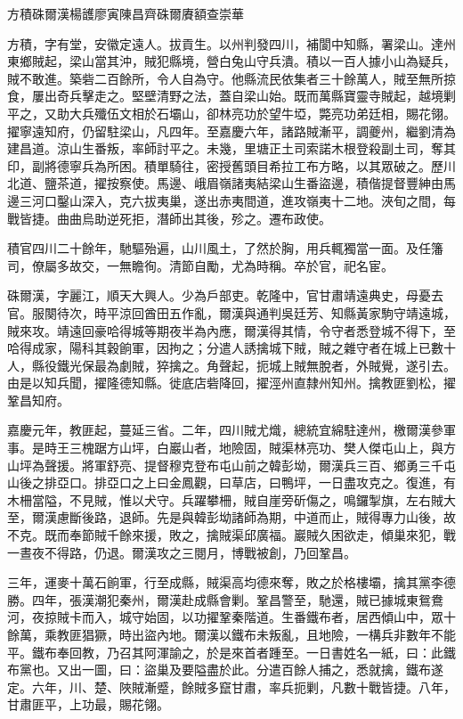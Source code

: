 
\begin{pinyinscope}
方積硃爾漢楊頀廖寅陳昌齊硃爾賡額查崇華

方積，字有堂，安徽定遠人。拔貢生。以州判發四川，補閬中知縣，署梁山。達州東鄉賊起，梁山當其沖，賊犯縣境，營白兔山守兵潰。積以一百人據小山為疑兵，賊不敢進。築砦二百餘所，令人自為守。他縣流民依集者三十餘萬人，賊至無所掠食，屢出奇兵擊走之。堅壁清野之法，蓋自梁山始。既而萬縣寶靈寺賊起，越境剿平之，又助大兵殲伍文相於石壩山，卻林亮功於望牛埡，斃亮功弟廷相，賜花翎。擢寧遠知府，仍留駐梁山，凡四年。至嘉慶六年，諸路賊漸平，調夔州，繼劉清為建昌道。涼山生番叛，率師討平之。未幾，里塘正土司索諾木根登殺副土司，奪其印，副將德寧兵為所困。積單騎往，密授舊頭目希拉工布方略，以其眾破之。歷川北道、鹽茶道，擢按察使。馬邊、峨眉嶺諸夷結梁山生番盜邊，積偕提督豐紳由馬邊三河口鑿山深入，克六拔夷巢，遂出赤夷間道，進攻嶺夷十二地。浹旬之間，每戰皆捷。曲曲烏助逆死拒，潛師出其後，殄之。遷布政使。

積官四川二十餘年，馳驅殆遍，山川風土，了然於胸，用兵輒獨當一面。及任籓司，僚屬多故交，一無瞻徇。清節自勵，尤為時稱。卒於官，祀名宦。

硃爾漢，字麗江，順天大興人。少為戶部吏。乾隆中，官甘肅靖遠典史，母憂去官。服闋待次，時平涼回酋田五作亂，爾漢與通判吳廷芳、知縣黃家駒守靖遠城，賊來攻。靖遠回豪哈得城等期夜半為內應，爾漢得其情，令守者悉登城不得下，至哈得成家，陽科其穀餉軍，因拘之；分遣人誘擒城下賊，賊之雜守者在城上已數十人，縣役鐵光保最為劇賊，猝擒之。角聲起，扼城上賊無脫者，外賊覺，遂引去。由是以知兵聞，擢隆德知縣。徙底店砦降回，擢涇州直隸州知州。擒教匪劉松，擢鞏昌知府。

嘉慶元年，教匪起，蔓延三省。二年，四川賊尤熾，總統宜綿駐達州，檄爾漢參軍事。是時王三槐踞方山坪，白巖山者，地險固，賊渠林亮功、樊人傑屯山上，與方山坪為聲援。將軍舒亮、提督穆克登布屯山前之韓彭坳，爾漢兵三百、鄉勇三千屯山後之排亞口。排亞口之上曰金鳳觀，曰草店，曰鴨坪，一日盡攻克之。復進，有木柵當隘，不見賊，惟以犬守。兵躍攀柵，賊自崖旁斫傷之，鳴鑼掣旗，左右賊大至，爾漢慮斷後路，退師。先是與韓彭坳諸師為期，中道而止，賊得專力山後，故不克。既而奉節賊千餘來援，敗之，擒賊渠邱廣福。巖賊久困欲走，傾巢來犯，戰一晝夜不得路，仍退。爾漢攻之三閱月，博戰被創，乃回鞏昌。

三年，運麥十萬石餉軍，行至成縣，賊渠高均德來奪，敗之於格樓壩，擒其黨李德勝。四年，張漢潮犯秦州，爾漢赴成縣會剿。鞏昌警至，馳還，賊已據城東鴛鴦河，夜掠賊卡而入，城守始固，以功擢鞏秦階道。生番鐵布者，居西傾山中，眾十餘萬，乘教匪猖獗，時出盜內地。爾漢以鐵布未叛亂，且地險，一構兵非數年不能平。鐵布奉回教，乃召其阿渾諭之，於是來首者踵至。一日書姓名一紙，曰：此鐵布黨也。又出一圖，曰：盜巢及要隘盡於此。分遣百餘人捕之，悉就擒，鐵布遂定。六年，川、楚、陜賊漸蹙，餘賊多竄甘肅，率兵扼剿，凡數十戰皆捷。八年，甘肅匪平，上功最，賜花翎。


\end{pinyinscope}
